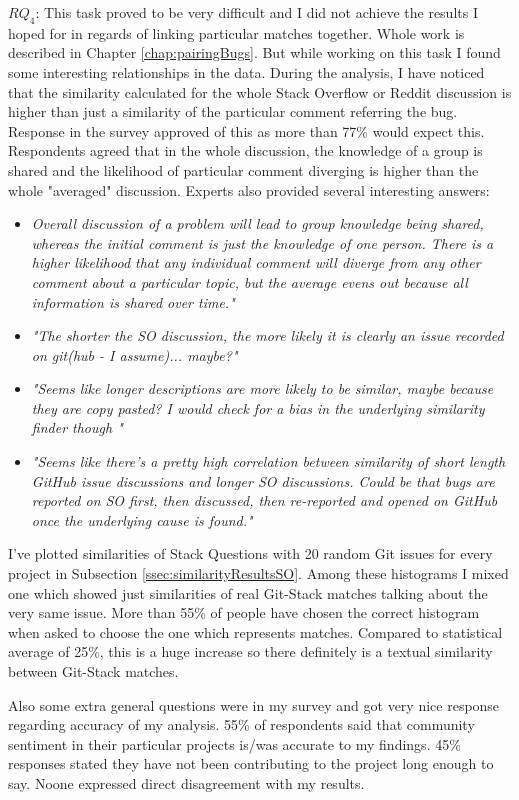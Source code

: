 \textbf{$RQ_{4}$}: This task proved to be very difficult and I did not achieve the results I hoped for in regards of linking particular matches together. Whole work is described in Chapter \ref{chap:pairingBugs}. But while working on this task I found some interesting relationships in the data. During the analysis, I have noticed that the similarity calculated for the whole Stack Overflow or Reddit discussion is higher than just a similarity of the particular comment referring the bug. Response in the survey approved of this as more than 77\% would expect this. Respondents agreed that in the whole discussion, the knowledge of a group is shared and the likelihood of particular comment diverging is higher than the whole "averaged" discussion. Experts also provided several interesting answers:
\begin{itemize}
\item \textit{Overall discussion of a problem will lead to group knowledge being shared, whereas the initial comment is just the knowledge of one person. There is a higher likelihood that any individual comment will diverge from any other comment about a particular topic, but the average evens out because all information is shared over time."}
\item \textit{"The shorter the SO discussion, the more likely it is clearly an issue recorded on git(hub - I assume)... maybe?"}
\item \textit{"Seems like longer descriptions are more likely to be similar, maybe because they are copy pasted? I would check for a bias in the underlying similarity finder though
"}
\item \textit{"Seems like there's a pretty high correlation between similarity of short length GitHub issue discussions and longer SO discussions. Could be that bugs are reported on SO first, then discussed, then re-reported and opened on GitHub once the underlying cause is found."}
\end{itemize} 
I've plotted similarities of Stack Questions with 20 random Git issues for every project in Subsection \ref{ssec:similarityResultsSO}. Among these histograms I mixed one which showed just similarities of real Git-Stack matches talking about the very same issue. More than 55\% of people have chosen the correct histogram when asked to choose the one which represents matches. Compared to statistical average of 25\%, this is a huge increase so there definitely is a textual similarity between Git-Stack matches.


Also some extra general questions were in my survey and got very nice response regarding accuracy of my analysis. 55\% of respondents said that community sentiment in their particular projects is/was accurate to my findings. 45\% responses stated they have not been contributing to the project long enough to say. Noone expressed direct disagreement with my results.